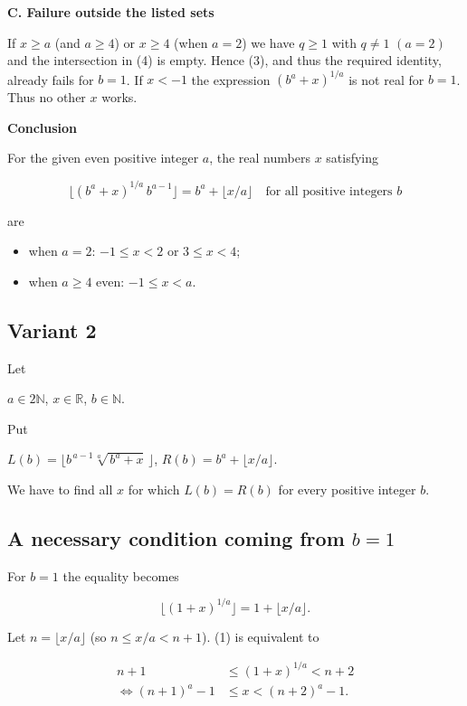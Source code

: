 \documentclass[12pt,a4paper]{article}
\theoremstyle{definition}
\begin{document}
    \textbf{C. Failure outside the listed sets}

    If $x \geq a$ (and $a \geq 4$) or $x \geq 4$ (when $a = 2$) we have $q \geq 1$ with $q \neq 1$ $(a=2)$
    and the intersection in (4) is empty.
    Hence (3), and thus the required identity, already fails for $b = 1$.
    If $x < -1$ the expression $(b^a + x)^{1/a}$ is not real for $b = 1$.
    Thus no other $x$ works.

    \textbf{Conclusion}

    For the given even positive integer $a$, the real numbers $x$ satisfying

    $$\lfloor (b^a + x)^{1/a} \, b^{a-1} \rfloor = b^a + \lfloor x/a \rfloor \quad \text{for all positive integers } b$$

    are

    \begin{itemize}
        \item when $a = 2$: $-1 \leq x < 2$ or $3 \leq x < 4$;
        \item when $a \geq 4$ even: $-1 \leq x < a$.
    \end{itemize}

\subsection{Variant 2}
        Let

        $a \in 2\mathbb{N}$, $x \in \mathbb{R}$, $b \in \mathbb{N}$.

        Put

        $L(b)=\lfloor b^{\,a-1}\sqrt[a]{\,b^{a}+x}\,\rfloor$, \quad
        $R(b)=b^{a}+\lfloor x/a\rfloor$.

        We have to find all $x$ for which $L(b)=R(b)$ for every positive integer $b$.

        \subsection*{A necessary condition coming from $b = 1$}

        For $b=1$ the equality becomes

        \begin{equation}
            \lfloor(1+x)^{1/a}\rfloor = 1+\lfloor x/a\rfloor.
        \end{equation}

        Let $n = \lfloor x/a\rfloor$ (so $n \leq x/a < n+1$).
        (1) is equivalent to

        \begin{align}
            n+1 &\leq (1+x)^{1/a} < n+2\\
            \Leftrightarrow (n+1)^a -1 &\leq x < (n+2)^a -1.
        \end{align}
\end{document}
